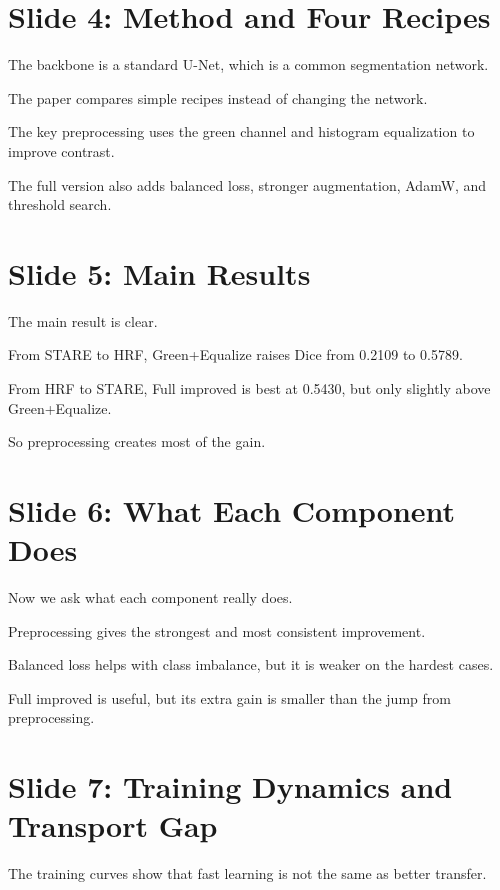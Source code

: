 \documentclass[12pt,a4paper]{article}
\begin{document}
\newpage

\section*{Slide 4: Method and Four Recipes}

The backbone is a standard U-Net, which is a common segmentation network.

The paper compares simple recipes instead of changing the network.

The key preprocessing uses the green channel and histogram equalization to improve contrast.

The full version also adds balanced loss, stronger augmentation, AdamW, and threshold search.

\newpage

\section*{Slide 5: Main Results}

The main result is clear.

From STARE to HRF, Green+Equalize raises Dice from 0.2109 to 0.5789.

From HRF to STARE, Full improved is best at 0.5430, but only slightly above Green+Equalize.

So preprocessing creates most of the gain.

\newpage

\section*{Slide 6: What Each Component Does}

Now we ask what each component really does.

Preprocessing gives the strongest and most consistent improvement.

Balanced loss helps with class imbalance, but it is weaker on the hardest cases.

Full improved is useful, but its extra gain is smaller than the jump from preprocessing.

\newpage

\section*{Slide 7: Training Dynamics and Transport Gap}

The training curves show that fast learning is not the same as better transfer.
\end{document}
